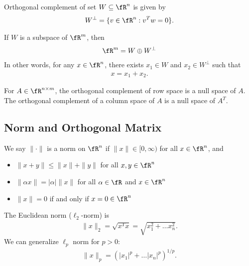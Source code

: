\documentclass{article}
\begin{document}
\begin{definition}
    Orthogonal complement of set $W\subseteq\fR^n$ is given by
    \begin{align}
        W^\perp = \{v\in\fR^n: v^T w = 0\}.
    \end{align}
\end{definition}

\begin{theorem}
    If $W$ is a subspace of $\fR^m$, then
    \begin{align}
        \fR^m = W\oplus W^\perp
    \end{align}
    In other words, for any $x\in \fR^n$, there exists $x_1\in W$ and $x_2\in W^\perp$ such that
    \begin{align}
        x = x_1 + x_2.
    \end{align}
\end{theorem}   

\begin{theorem}
For $A\in\fR^{n\times m}$, the orthogonal complement of row space is a null space of $A$.
The orthogonal complement of a column space of $A$ is a null space of $A^T$.
\end{theorem}



\subsection{Norm and Orthogonal Matrix}\label{subsec:orthogonal}
\begin{definition}
    We say $\|\cdot\|$ is a norm on $\fR^n$ if $\|x\|\in[0, \infty)$ for all $x\in\fR^n$, and
    \begin{itemize}
        \item $\|x+y\| \leq \|x\|+\|y\|$ for all $x, y\in\fR^n$
        \item $\|\alpha x\| = |\alpha|\|x\|$ for all $\alpha\in\fR$ and $x\in\fR^n$
        \item $\|x\|=0$ if and only if $x=0\in\fR^n$
    \end{itemize}
\end{definition}
The Euclidean norm ($\ell_2$-norm) is
\begin{align}
    \|x\|_2 = \sqrt{x^T x} = \sqrt{x_1^2+\dots x_n^2}.
\end{align}
We can generalize $\ell_p$ norm for $p>0$:
\begin{align}
    \|x\|_p = (|x_1|^p+\dots |x_n|^p)^{1/p}.
\end{align}
\end{document}
